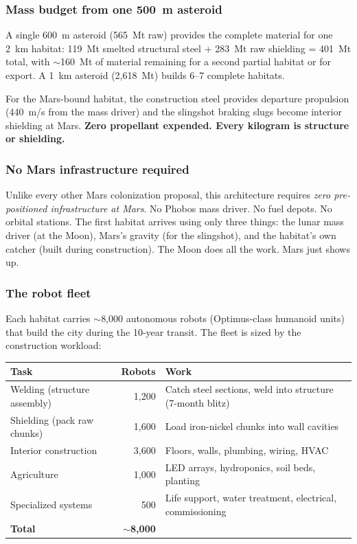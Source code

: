 \documentclass[12pt,letterpaper]{article}
\begin{document}
\subsubsection{Mass budget from one 500~m asteroid}

A single 600~m asteroid (565~Mt raw) provides the complete material for one 2~km habitat: 119~Mt smelted structural steel + 283~Mt raw shielding = 401~Mt total, with $\sim$160~Mt of material remaining for a second partial habitat or for export. A 1~km asteroid (2,618~Mt) builds 6--7 complete habitats.

For the Mars-bound habitat, the construction steel provides departure propulsion (440~m/s from the mass driver) and the slingshot braking slugs become interior shielding at Mars. \textbf{Zero propellant expended. Every kilogram is structure or shielding.}

\subsubsection{No Mars infrastructure required}

Unlike every other Mars colonization proposal, this architecture requires \emph{zero pre-positioned infrastructure at Mars}. No Phobos mass driver. No fuel depots. No orbital stations. The first habitat arrives using only three things: the lunar mass driver (at the Moon), Mars's gravity (for the slingshot), and the habitat's own catcher (built during construction). The Moon does all the work. Mars just shows up.

\subsubsection{The robot fleet}

Each habitat carries $\sim$8,000 autonomous robots (Optimus-class humanoid units) that build the city during the 10-year transit. The fleet is sized by the construction workload:

\begin{center}
\small
\begin{tabular}{lrp{6cm}}
\toprule
\textbf{Task} & \textbf{Robots} & \textbf{Work} \\
\midrule
Welding (structure assembly) & 1,200 & Catch steel sections, weld into structure (7-month blitz) \\
Shielding (pack raw chunks) & 1,600 & Load iron-nickel chunks into wall cavities \\
Interior construction & 3,600 & Floors, walls, plumbing, wiring, HVAC \\
Agriculture & 1,000 & LED arrays, hydroponics, soil beds, planting \\
Specialized systems & 500 & Life support, water treatment, electrical, commissioning \\
\midrule
\textbf{Total} & $\sim$\textbf{8,000} & \\
\bottomrule
\end{tabular}
\end{center}
\end{document}
